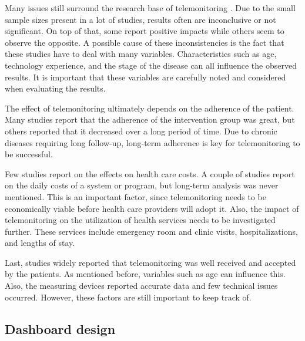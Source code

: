         Many issues still surround the research base of telemonitoring \cite{systematic_review}. Due to the small sample sizes present in a lot of studies, results often are inconclusive or not significant. On top of that, some report positive impacts while others seem to observe the opposite. A possible cause of these inconsistencies is the fact that these studies have to deal with many variables. Characteristics such as age, technology experience, and the stage of the disease can all influence the observed results. It is important that these variables are carefully noted and considered when evaluating the results.
        
        The effect of telemonitoring ultimately depends on the adherence of the patient. Many studies report that the adherence of the intervention group was great, but others reported that it decreased over a long period of time. Due to chronic diseases requiring long follow-up, long-term adherence is key for telemonitoring to be successful. 

        Few studies report on the effects on health care costs. A couple of studies report on the daily costs of a system or program, but long-term analysis was never mentioned. This is an important factor, since telemonitoring needs to be economically viable before health care providers will adopt it. Also, the impact of telemonitoring on the utilization of health services needs to be investigated further. These services include emergency room and clinic visits, hospitalizations, and lengths of stay. 
        
        Last, studies widely reported that telemonitoring was well received and accepted by the patients. As mentioned before, variables such as age can influence this. Also, the measuring devices reported accurate data and few technical issues occurred. However, these factors are still important to keep track of.

    \subsection{Dashboard design} \label{2_dashboards}

